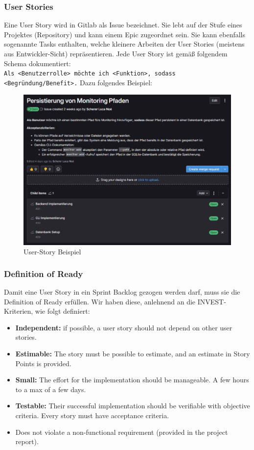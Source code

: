 \documentclass[a4paper,12pt]{report}
\begin{document}
    \clearpage

    \subsubsection{User Stories}
    Eine User Story wird in Gitlab als Issue bezeichnet.
    Sie lebt auf der Stufe eines Projektes (Repository) und kann einem Epic zugeordnet sein.
    Sie kann ebenfalls sogenannte Tasks enthalten, welche kleinere Arbeiten der User Stories (meistens aus Entwickler-Sicht) repräsentieren.
    Jede User Story ist gemäß folgendem Schema dokumentiert:
    \\
    \texttt{Als <Benutzerrolle> möchte ich <Funktion>, sodass <Begründung/Benefit>.}
    Dazu folgendes Beispiel:
    \begin{figure}[h]
        \centering
        \includegraphics[width=1\textwidth]{assets/user-story-example}
        \caption{User-Story Beispiel}
        \label{fig:user-story-example}
    \end{figure}

    \subsubsection{Definition of Ready}
    Damit eine User Story in ein Sprint Backlog gezogen werden darf, muss sie die Definition of Ready erfüllen.
    Wir haben diese, anlehnend an die INVEST-Kriterien, wie folgt definiert:
    \begin{itemize}
        \item \textbf{Independent:} if possible, a user story should not depend on other user stories.
        \item \textbf{Estimable:} The story must be possible to estimate, and an estimate in Story Points is provided.
        \item \textbf{Small:} The effort for the implementation should be manageable.
        A few hours to a max of a few days.
        \item \textbf{Testable:} Their successful implementation should be verifiable with objective criteria.
        Every story must have acceptance criteria.
        \item Does not violate a non-functional requirement (provided in the project report).
    \end{itemize}
\end{document}
